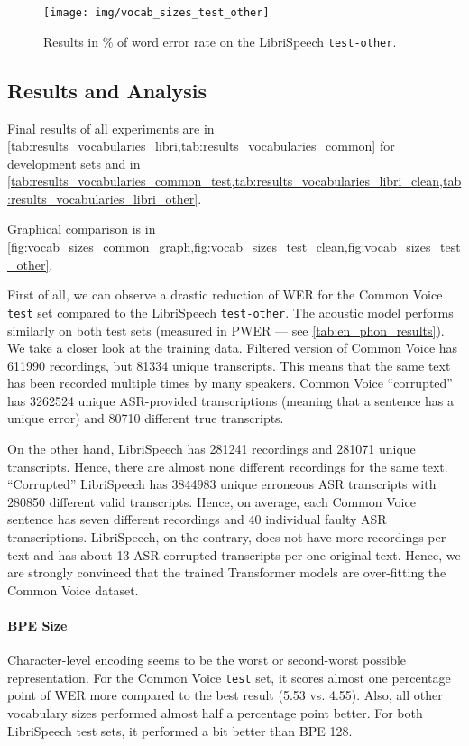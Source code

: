\begin{figure}[p]
	\centering
	\texttt{[image: img/vocab\_sizes\_test\_other]}
	\caption{Results in \% of word error rate on the LibriSpeech \texttt{test-other}.}
	\label{fig:vocab_sizes_test_other}
\end{figure}



\subsection{Results and Analysis}

Final results of all experiments are in \cref{tab:results_vocabularies_libri,tab:results_vocabularies_common} for development sets and in \cref{tab:results_vocabularies_common_test,tab:results_vocabularies_libri_clean,tab:results_vocabularies_libri_other}.

Graphical comparison is in \cref{fig:vocab_sizes_common_graph,fig:vocab_sizes_test_clean,fig:vocab_sizes_test_other}.

First of all, we can observe a drastic reduction of WER for the Common Voice \texttt{test} set compared to the LibriSpeech \texttt{test-other}. The acoustic model performs similarly on both test sets (measured in PWER --- see \cref{tab:en_phon_results}). We take a closer look at the training data. Filtered version of Common Voice has 611990 recordings, but 81334 unique transcripts. This means that the same text has been recorded multiple times by many speakers. Common Voice ``corrupted'' has 3262524 unique ASR-provided transcriptions (meaning that a sentence has a unique error) and 80710 different true transcripts.

On the other hand, LibriSpeech has 281241 recordings and 281071 unique transcripts. Hence, there are almost none different recordings for the same text. ``Corrupted'' LibriSpeech has 3844983 unique erroneous ASR transcripts with 280850 different valid transcripts. Hence, on average, each Common Voice sentence has seven different recordings and 40 individual faulty ASR transcriptions. LibriSpeech, on the contrary, does not have more recordings per text and has about 13 ASR-corrupted transcripts per one original text. Hence, we are strongly convinced that the trained Transformer models are over-fitting the Common Voice dataset.

\paragraph{BPE Size}
Character-level encoding seems to be the worst or second-worst possible representation. For the Common Voice \texttt{test} set, it scores almost one percentage point of WER more compared to the best result (5.53 vs. 4.55). Also, all other vocabulary sizes performed almost half a percentage point better. For both LibriSpeech test sets, it performed a bit better than BPE 128. 

